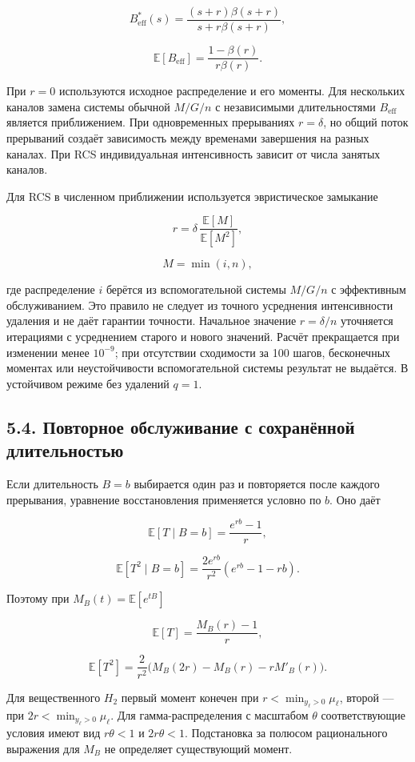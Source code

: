 \[B_{\mathrm{eff}}^*(s)=\frac{(s+r)\beta(s+r)}{s+r\beta(s+r)},\]

\[\mathbb E[B_{\mathrm{eff}}]=\frac{1-\beta(r)}{r\beta(r)}.\]


При \(r=0\) используются исходное распределение и его моменты. Для нескольких каналов замена системы обычной \(M/G/n\) с независимыми длительностями \(B_{\mathrm{eff}}\) является приближением. При одновременных прерываниях \(r=\delta\), но общий поток прерываний создаёт зависимость между временами завершения на разных каналах. При RCS индивидуальная интенсивность зависит от числа занятых каналов.

Для RCS в численном приближении используется эвристическое замыкание


\[r=\delta\,\frac{\mathbb E[M]}{\mathbb E[M^2]},\]

\[M=\min(i,n),\]


где распределение \(i\) берётся из вспомогательной системы \(M/G/n\) с эффективным обслуживанием. Это правило не следует из точного усреднения интенсивности удаления и не даёт гарантии точности. Начальное значение \(r=\delta/n\) уточняется итерациями с усреднением старого и нового значений. Расчёт прекращается при изменении менее \(10^{-9}\); при отсутствии сходимости за 100 шагов, бесконечных моментах или неустойчивости вспомогательной системы результат не выдаётся. В устойчивом режиме без удалений \(q=1.\)

\subsection*{5.4. Повторное обслуживание с сохранённой длительностью}
Если длительность \(B=b\) выбирается один раз и повторяется после каждого прерывания, уравнение восстановления применяется условно по \(b.\) Оно даёт


\[\mathbb E[T\mid B=b]=\frac{e^{rb}-1}{r},\]

\[\mathbb E[T^2\mid B=b]=\frac{2e^{rb}}{r^2}(e^{rb}-1-rb).\]


Поэтому при \(M_B(t)=\mathbb E[e^{tB}]\)


\[\mathbb E[T]=\frac{M_B(r)-1}{r},\]

\[\mathbb E[T^2]=\frac{2}{r^2}\bigl(M_B(2r)-M_B(r)-rM'_B(r)\bigr).\]


Для вещественного \(H_2\) первый момент конечен при \(r<\min_{y_\ell>0}\mu_\ell\), второй --- при \(2r<\min_{y_\ell>0}\mu_\ell.\) Для гамма-распределения с масштабом \(\theta\) соответствующие условия имеют вид \(r\theta<1\) и \(2r\theta<1.\) Подстановка за полюсом рационального выражения для \(M_B\) не определяет существующий момент.

